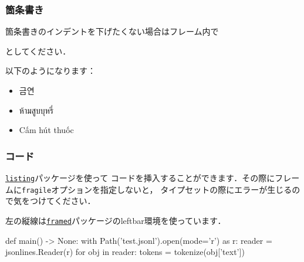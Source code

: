 \documentclass[%
  hyperref={%
    colorlinks,
    linkcolor=sDarkBlue,
    urlcolor=sDarkBlue,
    citecolor=sDarkBlue
  },
  aspectratio=169
]{beamer}
\newcommand{\inlinecommand}[1]{{\ttfamily #1}}
\begin{document}
    \begin{frame}[fragile]
        \frametitle{箇条書き}
        \addtolength{\leftmargini}{\labelsep}
        箇条書きのインデントを下げたくない場合はフレーム内で
        \begin{leftbar}
\begin{LaTeXCode}
\addtolength{\leftmargini}{\labelsep}
\end{LaTeXCode}
        \end{leftbar}
        としてください．

        \bigskip

        以下のようになります：

        \smallskip

        \begin{itemize}
            \item \begin{korean}금연\end{korean}
            \item \begin{thai}
ห้ามสูบบุหรี่
            \end{thai}
            \item \begin{vietnamese}
Cấm hút thuốc
            \end{vietnamese}
        \end{itemize}

    \end{frame}


    \begin{frame}[fragile]
        \frametitle{コード}
        \href{https://ctan.org/pkg/listings?lang=en}{\texttt{listing}}パッケージを使って
        コードを挿入することができます．その際にフレームに\texttt{fragile}オプションを指定しないと，
        タイプセットの際にエラーが生じるので気をつけてください．

        \bigskip

        左の縦線は\href{https://ctan.org/pkg/framed}{\texttt{framed}}パッケージの\inlinecommand{leftbar}環境を使っています．

        \smallskip

    \begin{leftbar}
\begin{PythonCode}
def main() -> None:
    with Path('test.jsonl').open(mode='r') as r:
        reader = jsonlines.Reader(r)
        for obj in reader:
            tokens = tokenize(obj['text'])
\end{PythonCode}
    \end{leftbar}

    \end{frame}
\end{document}
